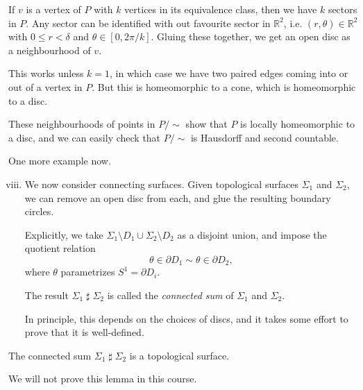 \documentclass[12pt]{article}
\DeclareMathOperator{\hash}{\sharp}%
\begin{document}
\begin{proofbox}
	If $v$ is a vertex of $P$ with $k$ vertices in its equivalence class, then we have $k$ sectors in $P$. Any sector can be identified with out favourite sector in $\mathbb{R}^2$, i.e. $(r, \theta) \in \mathbb{R}^2$ with $0 \leq r < \delta$ and $\theta \in [0, 2\pi/k]$. Gluing these together, we get an open disc as a neighbourhood of $v$.

	This works unless $k = 1$, in which case we have two paired edges coming into or out of a vertex in $P$. But this is homeomorphic to a cone, which is homeomorphic to a disc.

	These neighbourhoods of points in $P/\sim$ show that $P$ is locally homeomorphic to a disc, and we can easily check that $P/\sim$ is Hausdorff and second countable.
\end{proofbox}

\begin{exbox}
	One more example now.
	\begin{enumerate}[(i)]
		\setcounter{enumi}{7}
		\item We now consider connecting surfaces. Given topological surfaces $\Sigma_1$ and $\Sigma_2$, we can remove an open disc from each, and glue the resulting boundary circles.

			Explicitly, we take $\Sigma_1 \setminus D_1 \cup \Sigma_2 \setminus D_2$ as a disjoint union, and impose the quotient relation
			\[
			\theta \in \partial D_1 \sim \theta \in \partial D_2
			,\]
			where $\theta$ parametrizes $S^{1} = \partial D_i$.

			The result $\Sigma_1 \hash \Sigma_2$ is called the \emph{connected sum} of $\Sigma_1$ and $\Sigma_2$.

			In principle, this depends on the choices of discs, and it takes some effort to prove that it is well-defined.
	\end{enumerate}
\end{exbox}

\begin{lemma}
	The connected sum $\Sigma_1 \hash \Sigma_2$ is a topological surface.
\end{lemma}

We will not prove this lemma in this course.


\newpage

\printindex
\end{document}
